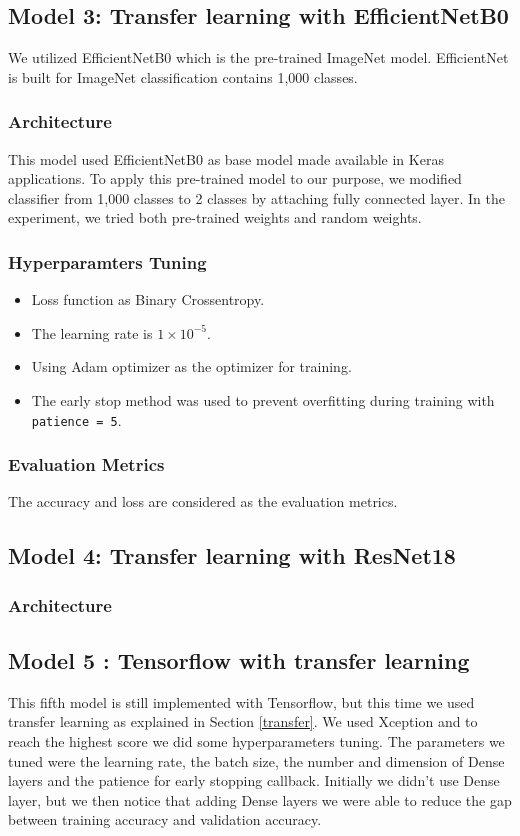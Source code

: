 \documentclass[conference]{IEEEtran}
\begin{document}
\subsection{Model 3: Transfer learning with EfficientNetB0}
We utilized EfficientNetB0\cite{DBLP:journals/corr/abs-1905-11946}  which is the pre-trained ImageNet model. EfficientNet is built for ImageNet classification contains 1,000 classes.
\subsubsection{Architecture}
This model used EfficientNetB0 as base model made available in Keras applications. To apply this pre-trained model to our purpose, we modified classifier from 1,000 classes to 2 classes by attaching fully connected layer. In the experiment, we tried both pre-trained weights and random weights.

\subsubsection{Hyperparamters Tuning}
\begin{itemize}
    \item Loss function as Binary Crossentropy.
    \item The learning rate is $1\times10^{-5}$.
    \item Using Adam optimizer as the optimizer for training. 
    \item The early stop method was used to prevent overfitting during training with \texttt{patience = 5}.
\end{itemize}

\subsubsection{Evaluation Metrics}
The accuracy and loss are considered as the evaluation metrics.


\subsection{Model 4: Transfer learning with ResNet18}
\subsubsection{Architecture}

\subsection{Model 5 : Tensorflow with transfer learning}
This fifth model is still implemented with Tensorflow, but this time we used transfer learning as explained in Section \ref{transfer}.
We used Xception and to reach the highest score we did some hyperparameters tuning. The parameters we tuned were the learning rate, the batch size, the number and dimension of Dense layers and the patience for early stopping callback.
Initially we didn't use Dense layer, but we then notice that adding Dense layers we were able to reduce the gap between training accuracy and validation accuracy.
\end{document}
